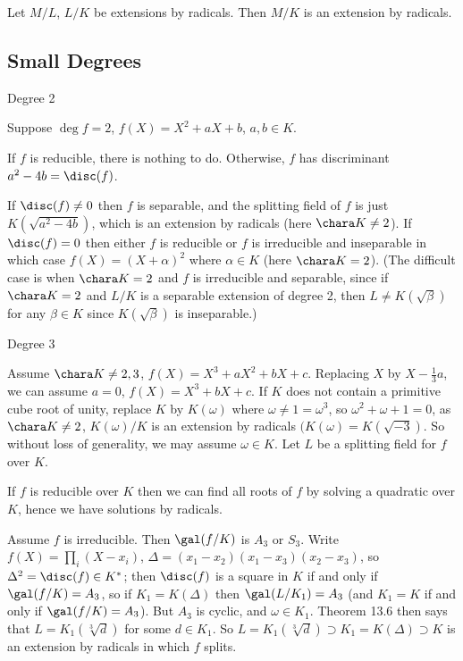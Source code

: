 \begin{lemma}
Let $M/L$, $L/K$ be extensions by radicals. Then $M/K$ is an extension by radicals.
\end{lemma}

\subsection{Small Degrees}

Degree 2

Suppose $\deg f = 2$, $f(X) = X^2 + aX + b$, $a, b \in K$.

If $f$ is reducible, there is nothing to do. Otherwise, $f$ has discriminant $a^2-4b = \disc(f)$.

If $\disc(f) \neq 0$ then $f$ is separable, and the splitting field of $f$ is just $K(\sqrt{a^2 - 4b})$, which is an extension by radicals (here $\chara K \neq 2$). If $\disc(f) = 0$ then either $f$ is reducible or $f$ is irreducible and inseparable in which case $f(X) = (X + \alpha)^2$ where $\alpha \in K$ (here $\chara K = 2$). (The difficult case is when $\chara K = 2$ and $f$ is irreducible and separable, since if $\chara K = 2$ and $L/K$ is a separable extension of degree 2, then $L \neq  K(\sqrt{\beta})$ for any $\beta \in K$ since $K(\sqrt{\beta})$ is inseparable.)

Degree 3

Assume $\chara K \neq  2, 3$, $f(X) = X^3 + aX^2 + bX + c$. Replacing $X$ by $X - \frac 13 a$, we can assume $a = 0$, $f(X) = X^3 + bX + c$. If $K$ does not contain a primitive cube root of unity, replace $K$ by $K(\omega)$ where $\omega \neq 1 = \omega^3$, so $\omega^2 + \omega + 1 = 0$, as $\chara K \neq  2$, $K(\omega)/K$ is an extension by radicals $(K(\omega) = K(\sqrt{-3})$. So without loss of generality, we may assume $\omega \in K$. Let $L$ be a splitting field for $f$ over $K$.

If $f$ is reducible over $K$ then we can find all roots of $f$ by solving a quadratic over $K$, hence we have solutions by radicals.

Assume $f$ is irreducible. Then $\gal(f/K)$ is $A_3$ or $S_3$. Write $f(X) = \prod_i(X - x_i)$, $\Delta = (x_1 - x_2)(x_1 - x_3)(x_2 - x_3)$, so $\Delta^2 = \disc(f) \in K^*$; then $\disc(f)$ is a square in $K$ if and only if $\gal(f/K) = A_3$, so if $K_1 = K(\Delta)$ then $\gal(L/K_1) = A_3$ (and $K_1 = K$
if and only if $\gal(f/K) = A_3$). But $A_3$ is cyclic, and $\omega \in K_1$. Theorem 13.6 then says that $L = K_1(\sqrt[3]{d})$ for some $d \in K_1$. So $L = K_1(\sqrt[3]{d}) \supset K_1 = K(\Delta) \supset K$ is an extension by radicals in which $f$ splits.

